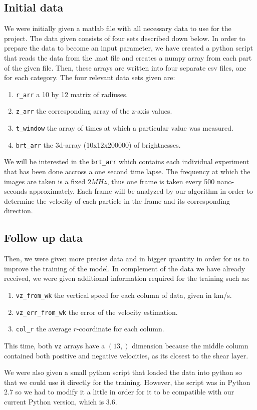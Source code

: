 \documentclass[10pt,conference,compsocconf]{IEEEtran}
\begin{document}
\subsection{Initial data}
We were initially given a matlab file with all necessary data to use for the project. The data given consists of four sets described down below. In order to prepare the data to become an input parameter, we have created a python script that reads the data from the .mat file and creates a numpy array from each part of the given file. Then, these arrays are written into four separate csv files, one for each category. The four relevant data sets given are:
\begin{enumerate}
  \item \texttt{r\_arr} a 10 by 12 matrix of radiuses.
  \item \texttt{z\_arr} the corresponding array of the z-axis values.
  \item \texttt{t\_window} the array of times at which a particular value was measured.
  \item \texttt{brt\_arr} the 3d-array (10x12x200000) of brightnesses.
\end{enumerate}
We will be interested in the \texttt{brt\_arr} which contains each individual experiment that has been done accross a one second time lapse. The frequency at which the images are taken is a fixed $2MHz$, thus one frame is taken every 500 nano-seconds approximately. Each frame will be analyzed by our algorithm in order to determine the velocity of each particle in the frame and its corresponding direction.
\subsection{Follow up data}
Then, we were given more precise data and in bigger quantity in order for us to improve the training of the model. In complement of the data we have already received, we were given additional information required for the training such as:
\begin{enumerate}
  \item \texttt{vz\_from\_wk} the vertical speed for each column of data, given in km/s.
  \item \texttt{vz\_err\_from\_wk} the error of the velocity estimation.
  \item \texttt{col\_r} the average $r$-coordinate for each column.
\end{enumerate}
This time, both \texttt{vz} arrays have a $(13,)$ dimension because the middle column contained both positive and negative velocities, as its closest to the shear layer.\par
We were also given a small python script that loaded the data into python so that we could use it directly for the training. However, the script was in Python 2.7 so we had to modify it a little in order for it to be compatible with our current Python version, which is 3.6.
\end{document}
